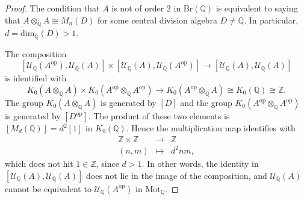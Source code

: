 \documentclass[10pt,a4paper]{amsart}
\newcommand{\op}{\mathrm{op}}
\begin{document}
\begin{proof}
The condition that $A$ is not of order $2$ in $\mathrm{Br}(\mathbb{Q})$ is  equivalent to saying that $ A \otimes_\mathbb{Q} A \cong M_n(D)$ for some central division algebra $D \neq \mathbb{Q}$. In particular, $d = \mathrm{dim}_\mathbb{Q}(D) > 1$.

The composition
\[ [ \mathcal{U}_\mathbb{Q}(A^{\op}),  \mathcal{U}_\mathbb{Q}(A) ] \times [ \mathcal{U}_\mathbb{Q}(A),  \mathcal{U}_\mathbb{Q}(A^{\op}) ] \rightarrow [ \mathcal{U}_\mathbb{Q}(A), \mathcal{U}_\mathbb{Q}(A) ] \]
is identified with
$$ K_0( A \otimes_\mathbb{Q} A  ) \times K_0( A^{\op} \otimes_\mathbb{Q} A^{\op}  ) \rightarrow K_0( A^{\op} \otimes_\mathbb{Q} A  )  \cong K_0( \mathbb{Q}  ) \cong \mathbb{Z}.$$
The group  $K_0( A \otimes_\mathbb{Q} A  )$ is generated by $[D]$ and the group $K_0( A^{\op} \otimes_\mathbb{Q} A^{\op}  )$ is generated by $[D^{\op}]$. The product of these two elements is $[M_{d}(\mathbb{Q})] = d^2[1]$ in $K_0( \mathbb{Q}  )$. Hence the multiplication map identifies with
$$ \begin{array}{rcl}
\mathbb{Z} \times \mathbb{Z} & \rightarrow & \mathbb{Z} \\
(n, m) & \mapsto & d^2 nm,
\end{array} $$
which does not hit $1 \in \mathbb{Z}$, since $d > 1$. In other words, the identity in $[ \mathcal{U}_\mathbb{Q}(A), \mathcal{U}_\mathbb{Q}(A) ]$ does not lie in the image of the composition, and $\mathcal{U}_\mathbb{Q}(A)$ cannot be equivalent to $\mathcal{U}_\mathbb{Q}(A^{\op})$ in $\mathrm{Mot}_\mathbb{Q}$.
\end{proof}
\end{document}
